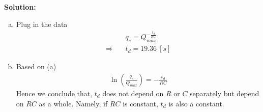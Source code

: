 \documentclass[a4paper, 11pt]{article}
\newenvironment{solution}
    {\textbf{Solution:}}
    {}
\begin{document}
\begin{solution}
	\begin{enumerate}[(a)]
		\item Plug in the data
		      \begin{align*}
			                        & q_e = Q_{max}^{-\frac{t_d}{RC}} \\
			      \Rightarrow \quad & t_d = 19.36\ [s]
		      \end{align*}
		\item Based on (a)
		      \begin{align}
			      \ln\left( \frac{q_e}{Q_{max}} \right) = -\frac{t_d}{RC}
		      \end{align}
		      Hence we conclude that, $t_d$ does not depend on $R$ or $C$ separately but
		      depend on $RC$ as a whole. Namely, if $RC$ is constant, $t_d$ is also a constant.
	\end{enumerate}

\end{solution}
\end{document}
